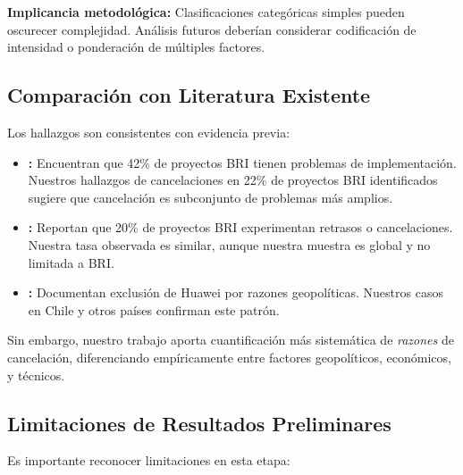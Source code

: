 \documentclass[12pt]{article}
\begin{document}
\textbf{Implicancia metodológica:} Clasificaciones categóricas simples pueden oscurecer complejidad. Análisis futuros deberían considerar codificación de intensidad o ponderación de múltiples factores.

\subsection{Comparación con Literatura Existente}

Los hallazgos son consistentes con evidencia previa:

\begin{itemize}
    \item \textbf{\citet{horn2021china}:} Encuentran que 42\% de proyectos BRI tienen problemas de implementación. Nuestros hallazgos de cancelaciones en 22\% de proyectos BRI identificados sugiere que cancelación es subconjunto de problemas más amplios.
    
    \item \textbf{\citet{malik2021banking}:} Reportan que 20\% de proyectos BRI experimentan retrasos o cancelaciones. Nuestra tasa observada es similar, aunque nuestra muestra es global y no limitada a BRI.
    
    \item \textbf{\citet{sacks2021economic}:} Documentan exclusión de Huawei por razones geopolíticas. Nuestros casos en Chile y otros países confirman este patrón.
\end{itemize}

Sin embargo, nuestro trabajo aporta cuantificación más sistemática de \textit{razones} de cancelación, diferenciando empíricamente entre factores geopolíticos, económicos, y técnicos.

\subsection{Limitaciones de Resultados Preliminares}

Es importante reconocer limitaciones en esta etapa:
\end{document}
